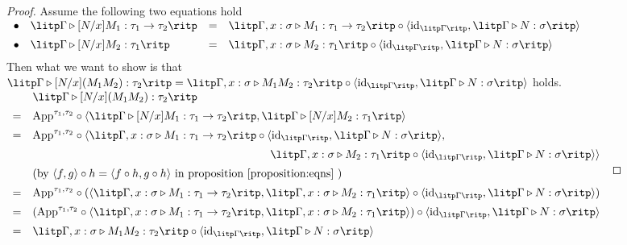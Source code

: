 \begin{proof}
Assume the following two equations hold\\[5pt]
$
\begin{array}{rlcl}
\bullet & \litp \Gamma \triangleright [N/x]M_1: \tau_1 \to \tau_2 \ritp & = & \litp \Gamma , x: \sigma \triangleright M_1: \tau_1 \to \tau_2 \ritp \circ \langle \text{id}_{\litp \Gamma \ritp} , \litp \Gamma \triangleright N: \sigma \ritp \rangle \\[5pt]
\bullet & \litp \Gamma \triangleright [N/x]M_2: \tau_1 \ritp & = & \litp \Gamma , x: \sigma \triangleright M_2: \tau_1 \ritp \circ \langle \text{id}_{\litp \Gamma \ritp} , \litp \Gamma \triangleright N: \sigma \ritp \rangle \\[5pt]
\end{array}
$\\[5pt]
Then what we want to show is that $ \litp \Gamma \triangleright [N/x](M_1 M_2): \tau_2 \ritp = \litp \Gamma , x: \sigma \triangleright M_1 M_2: \tau_2 \ritp \circ \langle \text{id}_{\litp \Gamma \ritp} , \litp \Gamma \triangleright N: \sigma \ritp \rangle $ holds.\\[5pt]
$
\begin{array}{rl}
   & \litp \Gamma \triangleright [N/x](M_1 M_2): \tau_2 \ritp \\[5pt]
 = & \text{App}^{\tau_1,\tau_2} \circ \langle \litp \Gamma \triangleright [N/x]M_1: \tau_1 \to \tau_2 \ritp , \litp \Gamma \triangleright [N/x]M_2: \tau_1 \ritp \rangle \\[5pt]
 = & \text{App}^{\tau_1,\tau_2} \circ \langle \litp \Gamma , x: \sigma \triangleright M_1: \tau_1 \to \tau_2 \ritp \circ \langle \text{id}_{\litp \Gamma \ritp} , \litp \Gamma \triangleright N: \sigma \ritp \rangle , \\[5pt]
 \multicolumn{2}{r}{\litp \Gamma , x: \sigma \triangleright M_2: \tau_1 \ritp \circ \langle \text{id}_{\litp \Gamma \ritp} , \litp \Gamma \triangleright N: \sigma \ritp \rangle \rangle} \\[5pt]
   & (\text{by } \langle f,g \rangle \circ h = \langle f \circ h , g \circ h \rangle \text{ in proposition \ref{proposition:eqns} } ) \\[5pt]
 = & \text{App}^{\tau_1,\tau_2} \circ ( \langle \litp \Gamma , x: \sigma \triangleright M_1: \tau_1 \to \tau_2 \ritp , \litp \Gamma , x: \sigma \triangleright M_2: \tau_1 \ritp \rangle \circ \langle \text{id}_{\litp \Gamma \ritp} , \litp \Gamma \triangleright N: \sigma \ritp \rangle ) \\[5pt]
 = & ( \text{App}^{\tau_1,\tau_2} \circ \langle \litp \Gamma , x: \sigma \triangleright M_1: \tau_1 \to \tau_2 \ritp , \litp \Gamma , x: \sigma \triangleright M_2: \tau_1 \ritp \rangle ) \circ \langle \text{id}_{\litp \Gamma \ritp} , \litp \Gamma \triangleright N: \sigma \ritp \rangle \\[5pt]
 = & \litp \Gamma , x: \sigma \triangleright M_1 M_2: \tau_2 \ritp \circ \langle \text{id}_{\litp \Gamma \ritp} , \litp \Gamma \triangleright N: \sigma \ritp \rangle \\[10pt]
\end{array}
$


\end{proof}
